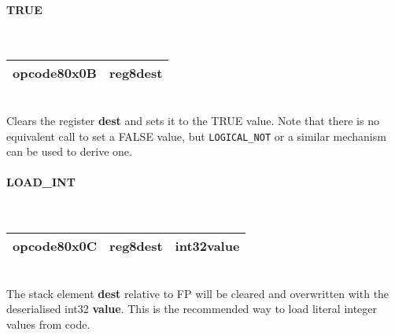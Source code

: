 \documentclass[12pt,a4paper]{article}
\begin{document}
\vspace{2em}\begin{minipage}{\textwidth}
\paragraph{TRUE}
~\vspace{1em}\\\begin{tabular}{|p{2cm}|p{2cm}|}
\hline
opcode8\newline\textbf{0x0B} & reg8\newline\textbf{dest} \\
\hline
\end{tabular}\vspace{1em}\\
Clears the register \textbf{dest} and sets it to the TRUE value. Note that there
is no equivalent call to set a FALSE value, but \verb|LOGICAL_NOT| or a similar
mechanism can be used to derive one.
\end{minipage}

\vspace{2em}\begin{minipage}{\textwidth}
\paragraph{LOAD\_INT}
~\vspace{1em}\\\begin{tabular}{|p{2cm}|p{2cm}|p{8cm}|}
\hline
opcode8\newline\textbf{0x0C} & reg8\newline\textbf{dest} & int32\newline\textbf{value} \\
\hline
\end{tabular}\vspace{1em}\\
The stack element \textbf{dest} relative to FP will be cleared and overwritten with the deserialised int32 \textbf{value}. This is the recommended way to load literal integer values from code.
\end{minipage}
\end{document}
